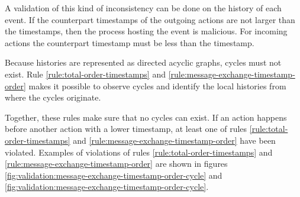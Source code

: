 	\noindent A validation of this kind of inconsistency can be done on the history of each event. If the counterpart timestamps of the outgoing actions are not larger than the timestamps, then the process hosting the event is malicious. For incoming actions the counterpart timestamp must be less than the timestamp.
	
	\newpar Because histories are represented as directed acyclic graphs, cycles must not exist. Rule \ref{rule:total-order-timestamps} and \ref{rule:message-exchange-timestamp-order} makes it possible to observe cycles and identify the local histories from where the cycles originate.
	
	Together, these rules make sure that no cycles can exist. If an action happens before another action with a lower timestamp, at least one of rules \ref{rule:total-order-timestamps} and \ref{rule:message-exchange-timestamp-order} have been violated. Examples of violations of rules \ref{rule:total-order-timestamps} and \ref{rule:message-exchange-timestamp-order} are shown in figures \ref{fig:validation:message-exchange-timestamp-order-cycle} and \ref{fig:validation:message-exchange-timestamp-order-cycle}.
	
